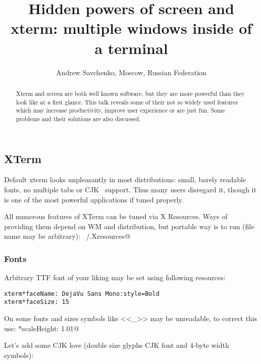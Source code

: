 \documentclass[10pt, a5paper]{article}
\begin{document}
\title{Hidden powers of screen and xterm: multiple windows inside of a terminal}
\author{Andrew Savchenko, Moscow, Russian Federation}
\maketitle
\begin{abstract}
Xterm and screen are both well known software, but they are more powerful than they look like at a first glance. This talk reveals some of their not so widely used features which may increase productivity, improve user experience or are just fun. Some problems and their solutions are also discussed.
\end{abstract}

\lstset{ %
language=C,                 %
basicstyle=\small\sffamily, %
breaklines=true,           %
breakatwhitespace=false, %
}

\subsection*{XTerm}

Default xterm looks unpleasantly in most distributions: small, barely readable fonts, no multiple tabs or CJK~\cite{Savchenko1} support. Thus many users disregard it, though it is one of the most powerful applications if tuned properly.

All numerous features of XTerm can be tuned via X Resources. Ways of providing them depend on WM and distribution, but portable way is to run (file name may be arbitrary):
\verb@xrdb ~/.Xresources@

\subsubsection*{Fonts}

Arbitrary TTF font of your liking may be set using following \linebreak resources:

\begin{verbatim}
xterm*faceName: DejaVu Sans Mono:style=Bold
xterm*faceSize: 15
\end{verbatim}
On some fonts and sizes symbols like <<\_>> may be unreadable, to correct this use:
\verb@xterm*scaleHeight: 1.01@

Let's add some CJK love (double size glyphs CJK font and 4-byte width symbols):
\end{document}
